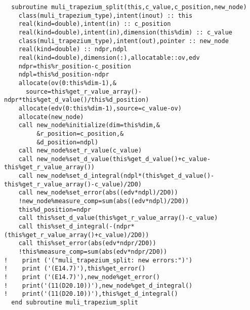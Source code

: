 \begin{Verbatim}
  subroutine muli_trapezium_split(this,c_value,c_position,new_node)
    class(muli_trapezium_type),intent(inout) :: this
    real(kind=double),intent(in) :: c_position
    real(kind=double),intent(in),dimension(this%dim) :: c_value
    class(muli_trapezium_type),intent(out),pointer :: new_node
    real(kind=double) :: ndpr,ndpl
    real(kind=double),dimension(:),allocatable::ov,edv
    ndpr=this%r_position-c_position
    ndpl=this%d_position-ndpr
    allocate(ov(0:this%dim-1),&
      source=this%get_r_value_array()-ndpr*this%get_d_value()/this%d_position)
    allocate(edv(0:this%dim-1),source=c_value-ov)
    allocate(new_node)
    call new_node%initialize(dim=this%dim,&
         &r_position=c_position,&
         &d_position=ndpl)
    call new_node%set_r_value(c_value)
    call new_node%set_d_value(this%get_d_value()+c_value-this%get_r_value_array())
    call new_node%set_d_integral(ndpl*(this%get_d_value()-this%get_r_value_array()-c_value)/2D0)
    call new_node%set_error(abs((edv*ndpl)/2D0))
    !new_node%measure_comp=sum(abs((edv*ndpl)/2D0))
    this%d_position=ndpr
    call this%set_d_value(this%get_r_value_array()-c_value)
    call this%set_d_integral(-(ndpr*(this%get_r_value_array()+c_value)/2D0))
    call this%set_error(abs(edv*ndpr/2D0))
    !this%measure_comp=sum(abs(edv*ndpr/2D0))
!    print ('("muli_trapezium_split: new errors:")')
!    print ('(E14.7)'),this%get_error()
!    print ('(E14.7)'),new_node%get_error()
!    print('(11(D20.10))'),new_node%get_d_integral()
!    print('(11(D20.10))'),this%get_d_integral()
  end subroutine muli_trapezium_split
\end{Verbatim}

